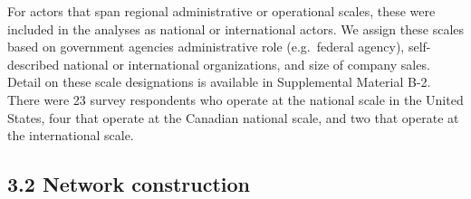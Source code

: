 \documentclass[twoside,12pt,final]{ucthesis-CA2012}
\begin{document}
\begin{ucmainmatter}
For actors that span regional administrative or operational scales,
these were included in the analyses as \textquotesingle national\textquotesingle{} or \textquotesingle international\textquotesingle{}
actors. We assign these scales based on government agencies\textquotesingle{}
administrative role (e.g.~federal agency), self-described \textquotesingle national\textquotesingle{}
or \textquotesingle international\textquotesingle{} organizations, and size of company sales. Detail on
these scale designations is available in Supplemental Material B-2.
There were 23 survey respondents who operate at the national scale in
the United States, four that operate at the Canadian national scale, and
two that operate at the international scale.
\begin{table}

\caption{\label{tab:unnamed-chunk-15}Organic seed innovation system sample population and survey response rate by operational scale and geography}
\centering
{}
\end{table}
\hypertarget{network-construction}{%
\subsection{3.2 Network construction}\label{network-construction}}


\end{ucmainmatter}
\end{document}

